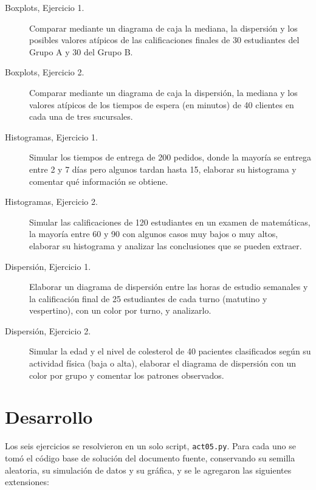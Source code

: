 \documentclass[11pt,letterpaper]{article}
\begin{document}
\begin{description}
    \item[Boxplots, Ejercicio 1.] Comparar mediante un diagrama de caja la mediana, la dispersión y los posibles valores atípicos de las calificaciones finales de 30 estudiantes del Grupo A y 30 del Grupo B.
    \item[Boxplots, Ejercicio 2.] Comparar mediante un diagrama de caja la dispersión, la mediana y los valores atípicos de los tiempos de espera (en minutos) de 40 clientes en cada una de tres sucursales.
    \item[Histogramas, Ejercicio 1.] Simular los tiempos de entrega de 200 pedidos, donde la mayoría se entrega entre 2 y 7 días pero algunos tardan hasta 15, elaborar su histograma y comentar qué información se obtiene.
    \item[Histogramas, Ejercicio 2.] Simular las calificaciones de 120 estudiantes en un examen de matemáticas, la mayoría entre 60 y 90 con algunos casos muy bajos o muy altos, elaborar su histograma y analizar las conclusiones que se pueden extraer.
    \item[Dispersión, Ejercicio 1.] Elaborar un diagrama de dispersión entre las horas de estudio semanales y la calificación final de 25 estudiantes de cada turno (matutino y vespertino), con un color por turno, y analizarlo.
    \item[Dispersión, Ejercicio 2.] Simular la edad y el nivel de colesterol de 40 pacientes clasificados según su actividad física (baja o alta), elaborar el diagrama de dispersión con un color por grupo y comentar los patrones observados.
\end{description}

\section{Desarrollo}

Los seis ejercicios se resolvieron en un solo script, \texttt{act05.py}. Para cada uno se tomó el código base de solución del documento fuente, conservando su semilla aleatoria, su simulación de datos y su gráfica, y se le agregaron las siguientes extensiones:
\end{document}
